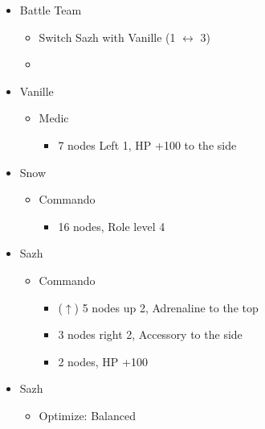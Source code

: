 	\begin{menu}
		\begin{itemize}
			\paradigm
			\begin{itemize}
				\item Battle Team
				      \begin{itemize}
					      \item Switch Sazh with Vanille (1 $\leftrightarrow$ 3)
					      \item {}%
					            {\paradigmline{(\med)}{\com}{(\com)}}%
					            {\paradigmline{(\sab)}{\com}{\com}}%
					            {\paradigmline{(\sab)}{\sen}{(\syn)}}%
					            {\paradigmline{(\rav)}{(\rav)}{(\syn)}}%
					            {\paradigmline[5]{\textit{(\sab)}}{\textit{(\rav)}}{\textit{\rav}}}%
					            {\paradigmline{\rav}{\rav}{\rav}}
				      \end{itemize}
			\end{itemize}
			\crystarium
			\begin{itemize}
				\item Vanille
				      \begin{itemize}
					      \item Medic
					            \begin{itemize}
						            \item 7 nodes Left 1, HP +100 to the side
					            \end{itemize}
				      \end{itemize}
				\item Snow
				      \begin{itemize}
					      \item Commando
					            \begin{itemize}
						            \item 16 nodes, Role level 4
					            \end{itemize}
				      \end{itemize}
				\item Sazh
				      \begin{itemize}
					      \item Commando
					            \begin{itemize}
						            \item ($\uparrow$) 5 nodes up 2, Adrenaline to the top
						            \item 3 nodes right 2, Accessory to the side
						            \item 2 nodes, HP +100
					            \end{itemize}
				      \end{itemize}
			\end{itemize}
			\equip
			\begin{itemize}
				\item Sazh
				      \begin{itemize}
					      \item Optimize: Balanced
				      \end{itemize}
			\end{itemize}
		\end{itemize}
	\end{menu}

